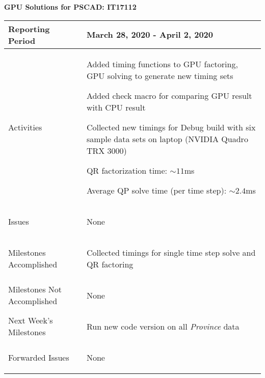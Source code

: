 \documentclass[11pt,letterpaper]{article}
\begin{document}
\vspace{.2in}
\begin{center}
    {\bf GPU Solutions for PSCAD: IT17112}
\end{center}

	\vspace{.25in}

\begin{tabular}{| p{} | p{} |}
	\hline
	Reporting Period & March 28, 2020 - April 2, 2020 \\ \hline

	Activities & \begin{enumerate*}
	\item[\tiny\textbullet] Added timing functions to GPU factoring, GPU solving to generate new timing sets \newline
  \item[\tiny\textbullet] Added check macro for comparing GPU result with CPU result \newline
	\item[\tiny\textbullet] Collected new timings for Debug build with six sample data sets on laptop (NVIDIA Quadro TRX 3000) \newline
	\item[\tiny\textbullet] QR factorization time: $\sim 11$ms \newline
  \item[\tiny\textbullet] Average QP solve time (per time step): $\sim 2.4$ms
	\end{enumerate*} \\ \hline

	Issues & \begin{enumerate*}
	\item[\tiny\textbullet] None
	\end{enumerate*} \\ \hline

	Milestones \newline Accomplished & \begin{enumerate*}
	\item[\tiny\textbullet] Collected timings for single time step solve and QR factoring
  \end{enumerate*} \\ \hline

	Milestones Not \newline Accomplished & \begin{enumerate*}
	\item[\tiny\textbullet] None
	\end{enumerate*} \\ \hline

	Next Week's \newline Milestones & \begin{enumerate*}
	\item[\tiny\textbullet] Run new code version on all \emph{Province} data
	\end{enumerate*} \\ \hline

	Forwarded Issues & \begin{enumerate*}
	\item[\tiny\textbullet] None
	\end{enumerate*} \\ \hline
\end{tabular}
\end{document}
